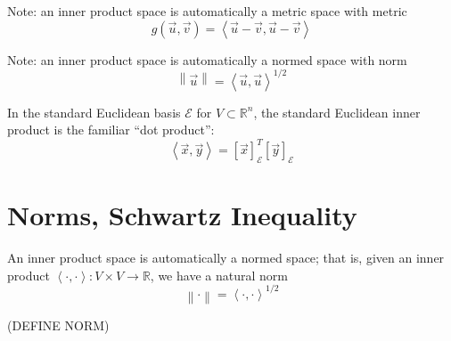 Note: an inner product space is automatically a metric space with metric \[ g\left(\vec{u},\vec{v}\right) = \left\langle \vec{u}-\vec{v}, \vec{u}-\vec{v} \right\rangle \]

Note: an inner product space is automatically a normed space with norm \[ \left\lVert \vec{u} \right\rVert = \left\langle \vec{u}, \vec{u} \right\rangle^{1/2} \]

In the standard Euclidean basis $\mathcal{E}$ for $V \subset \mathbb{R}^n$, the standard Euclidean inner product is the familiar ``dot product'': \[ \left\langle \vec{x}, \vec{y} \right\rangle = \left[ \vec{x}\right]^T_{\mathcal{E}} \left[ \vec{y}\right]_{\mathcal{E}} \]



\section{Norms, Schwartz Inequality}

An inner product space is automatically a normed space; that is, given an inner product $\left\langle \cdot, \cdot \right\rangle: V\times V \rightarrow \mathbb{R}$, we have a natural norm \[ \left\lVert \cdot \right\rVert = \left\langle \cdot, \cdot \right\rangle^{1/2} \]

(DEFINE NORM)

